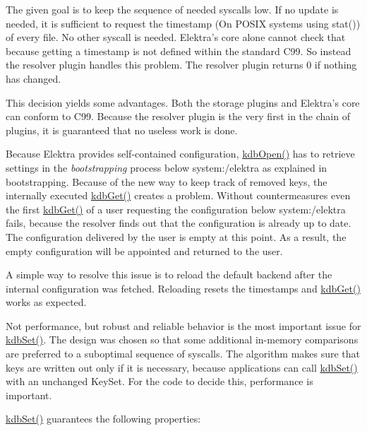 The given goal is to keep the sequence of needed syscalls low. If no update is needed, it is sufficient to request the timestamp (On P\+O\+S\+IX systems using {\ttfamily stat()}) of every file. No other syscall is needed. Elektra’s core alone cannot check that because getting a timestamp is not defined within the standard C99. So instead the resolver plugin handles this problem. The resolver plugin returns 0 if nothing has changed.

This decision yields some advantages. Both the storage plugins and Elektra’s core can conform to C99. Because the resolver plugin is the very first in the chain of plugins, it is guaranteed that no useless work is done.

Because Elektra provides self-\/contained configuration, {\ttfamily \hyperlink{group__kdb_ga6808defe5870f328dd17910aacbdc6ca}{kdb\+Open()}} has to retrieve settings in the {\itshape bootstrapping} process below {\ttfamily system\+:/elektra} as explained in {\ttfamily bootstrapping}. Because of the new way to keep track of removed keys, the internally executed {\ttfamily \hyperlink{group__kdb_ga28e385fd9cb7ccfe0b2f1ed2f62453a1}{kdb\+Get()}} creates a problem. Without countermeasures even the first {\ttfamily \hyperlink{group__kdb_ga28e385fd9cb7ccfe0b2f1ed2f62453a1}{kdb\+Get()}} of a user requesting the configuration below {\ttfamily system\+:/elektra} fails, because the resolver finds out that the configuration is already up to date. The configuration delivered by the user is empty at this point. As a result, the empty configuration will be appointed and returned to the user.

A simple way to resolve this issue is to reload the default backend after the internal configuration was fetched. Reloading resets the timestamps and {\ttfamily \hyperlink{group__kdb_ga28e385fd9cb7ccfe0b2f1ed2f62453a1}{kdb\+Get()}} works as expected.

Not performance, but robust and reliable behavior is the most important issue for {\ttfamily \hyperlink{group__kdb_ga11436b058408f83d303ca5e996832bcf}{kdb\+Set()}}. The design was chosen so that some additional in-\/memory comparisons are preferred to a suboptimal sequence of {\ttfamily syscalls}. The algorithm makes sure that keys are written out only if it is necessary, because applications can call {\ttfamily \hyperlink{group__kdb_ga11436b058408f83d303ca5e996832bcf}{kdb\+Set()}} with an unchanged {\ttfamily Key\+Set}. For the code to decide this, performance is important.

{\ttfamily \hyperlink{group__kdb_ga11436b058408f83d303ca5e996832bcf}{kdb\+Set()}} guarantees the following properties\+:


